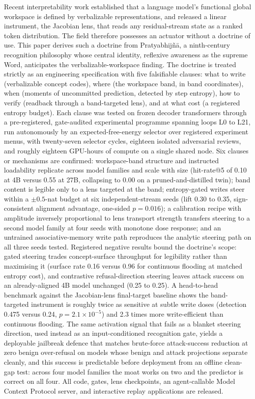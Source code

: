 Recent interpretability work established that a language model's functional global workspace is defined by verbalizable representations, and released a linear instrument, the Jacobian lens, that reads any residual-stream state as a ranked token distribution. The field therefore possesses an actuator without a doctrine of use. This paper derives such a doctrine from Pratyabhij\~n\=a, a ninth-century recognition philosophy whose central identity, reflexive awareness as the supreme Word, anticipates the verbalizable-workspace finding. The doctrine is treated strictly as an engineering specification with five falsifiable clauses: what to write (verbalizable concept codes), where (the workspace band, in band coordinates), when (moments of uncommitted prediction, detected by step entropy), how to verify (readback through a band-targeted lens), and at what cost (a registered entropy budget). Each clause was tested on frozen decoder transformers through a pre-registered, gate-audited experimental programme spanning loops L0 to L21, run autonomously by an expected-free-energy selector over registered experiment menus, with twenty-seven selector cycles, eighteen isolated adversarial reviews, and roughly eighteen GPU-hours of compute on a single shared node. Six clauses or mechanisms are confirmed: workspace-band structure and instructed loadability replicate across model families and scale with size (hit-rate@5 of 0.10 at 4B versus 0.55 at 27B, collapsing to 0.00 on a pruned-and-distilled twin); band content is legible only to a lens targeted at the band; entropy-gated writes steer within a $\pm0.5$-nat budget at six independent-stream seeds (lift 0.30 to 0.35, sign-consistent alignment advantage, one-sided $p=0.016$); a calibration recipe with amplitude inversely proportional to lens transport strength transfers steering to a second model family at four seeds with monotone dose response; and an untrained associative-memory write path reproduces the analytic steering path on all three seeds tested. Registered negative results bound the doctrine's scope: gated steering trades concept-surface throughput for legibility rather than maximising it (surface rate 0.16 versus 0.96 for continuous flooding at matched entropy cost), and contrastive refusal-direction steering leaves attack success on an already-aligned 4B model unchanged (0.25 to 0.25). A head-to-head benchmark against the Jacobian-lens final-target baseline shows the band-targeted instrument is roughly twice as sensitive at subtle write doses (detection 0.475 versus 0.24, $p=2.1\times10^{-5}$) and 2.3 times more write-efficient than continuous flooding. The same activation signal that fails as a blanket steering direction, used instead as an input-conditioned recognition gate, yields a deployable jailbreak defence that matches brute-force attack-success reduction at zero benign over-refusal on models whose benign and attack projections separate cleanly, and this success is predictable before deployment from an offline clean-gap test: across four model families the moat works on two and the predictor is correct on all four. All code, gates, lens checkpoints, an agent-callable Model Context Protocol server, and interactive replay applications are released.
